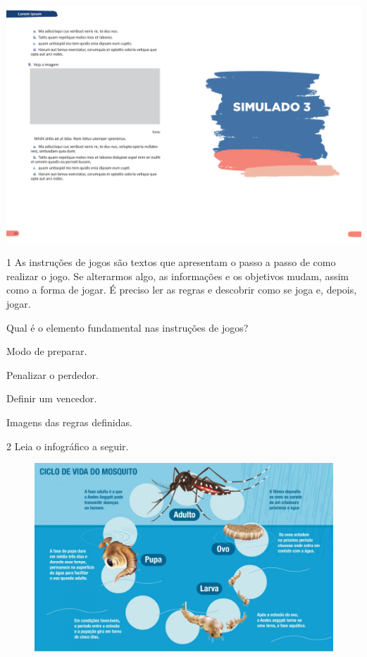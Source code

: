 \vspace*{-3.4cm}
\hspace*{-3.7cm}\includegraphics[scale=1]{../watermarks/3simulado5ano.pdf}

\num{1} As instruções de jogos são textos que apresentam o passo a passo
de como realizar o jogo. Se alterarmos algo, as informações e os objetivos
mudam, assim como a forma de jogar. É preciso ler as regras e descobrir
como se joga e, depois, jogar.

Qual é o elemento fundamental nas instruções de jogos?

\begin{escolha}
\item Modo de preparar.

\item Penalizar o perdedor.

\item Definir um vencedor.

\item Imagens das regras definidas.
\end{escolha}

\num{2} Leia o infográfico a seguir.

\begin{figure}[htpb!]
\includegraphics[width=\textwidth]{media/image37.jpeg}
\end{figure}

